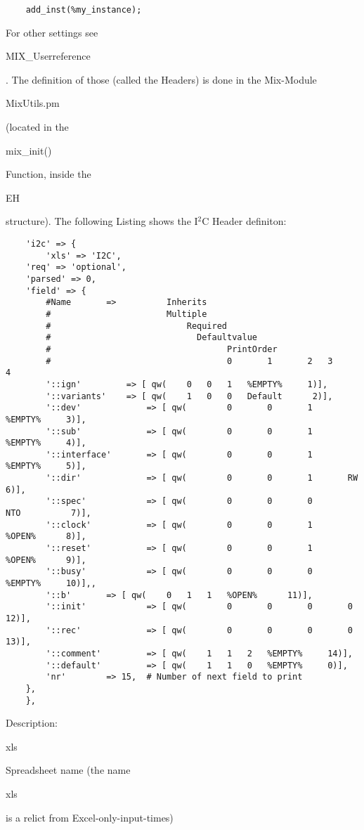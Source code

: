 \documentclass[a4paper,12pt]{article}
\begin{document}
{\begin{verbatim}
    add_inst(%my_instance);
\end{verbatim}\rm
For other settings see \begin{tt}MIX\_Userreference\end{tt}. The definition of those (called the Headers) is done in the Mix-Module \begin{tt}MixUtils.pm\end{tt} (located in the \begin{tt}mix\_init()\end{tt} Function, inside the \begin{tt}EH\end{tt} structure). The following Listing shows the I$^2$C Header definiton:\newline
\begin{verbatim}
    'i2c' => {
        'xls' => 'I2C',
	'req' => 'optional',
	'parsed' => 0,
	'field' => {
	    #Name   	=>	  	    Inherits
	    #					    Multiple
	    #						    Required
	    #							  Defaultvalue
	    #								    PrintOrder
	    #                                   0       1       2	3       4
	    '::ign' 		=> [ qw(	0	0	1	%EMPTY%     1)],
	    '::variants'	=> [ qw(	1	0	0	Default	     2)],
	    '::dev'             => [ qw(        0       0       1       %EMPTY%     3)],
	    '::sub'             => [ qw(        0       0       1       %EMPTY%     4)],
	    '::interface'       => [ qw(        0       0       1       %EMPTY%     5)],
	    '::dir'             => [ qw(        0       0       1       RW           6)],
	    '::spec'            => [ qw(        0       0       0       NTO          7)],
	    '::clock'           => [ qw(        0       0       1       %OPEN%      8)],
	    '::reset'           => [ qw(        0       0       1       %OPEN%      9)],
	    '::busy'            => [ qw(        0       0       0       %EMPTY%     10)],,
	    '::b'		=> [ qw(	0	1	1	%OPEN%      11)],
	    '::init'            => [ qw(        0       0       0       0            12)],
	    '::rec'             => [ qw(        0       0       0       0            13)],
	    '::comment'	        => [ qw(	1	1	2	%EMPTY%     14)],
	    '::default'	        => [ qw(	1	1	0	%EMPTY%     0)],
	    'nr'		=> 15,  # Number of next field to print
	},
    },
\end{verbatim}
Description: \begin{tt}xls\end{tt} Spreadsheet name (the name \begin{tt}xls\end{tt} is a relict from Excel-only-input-times)\newline
}
\end{document}
